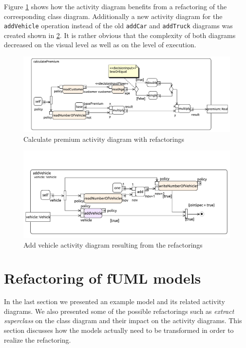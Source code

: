 \documentclass{llncs}
\begin{document}
Figure \ref{fig:calculatePremiumRef} shows how the activity diagram benefits from a refactoring of the corresponding 
class diagram. Additionally a new activity diagram for the \texttt{addVehicle} operation instead of the old 
\texttt{addCar} and \texttt{addTruck} diagrams was created shown in \ref{fig:addCarRef}. It is rather obvious 
that the complexity of both diagrams decreased on the visual level as well as on the level of execution.

\begin{figure}[h!t]
 \centering
 \includegraphics[scale=0.5]{images/insurance_ref/Activity_calculatePremium_calculatePremium}
 \caption{Calculate premium activity diagram with refactorings}
 \label{fig:calculatePremiumRef}
\end{figure}

\begin{figure}[h!t]
 \centering
 \includegraphics[scale=0.6]{images/insurance_ref/Activity_addVehicle_addVehicle}
 \caption{Add vehicle activity diagram resulting from the refactorings}
 \label{fig:addCarRef}
\end{figure}

\section{Refactoring of fUML models}
\label{sec:fuml-refactoring}

In the last section we presented an example model and its related activity diagrams. We also presented some of the possible 
refactorings such as \textit{extract superclass} on the class diagram and their impact on the activity diagrams. This 
section discusses how the models actually need to be transformed in order to realize the refactoring.
\end{document}
